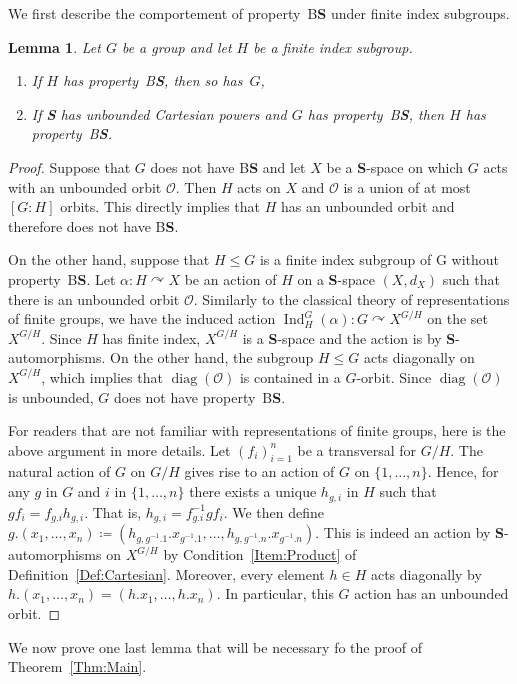 \documentclass[a4paper]{article}
\newtheorem{lem}{Lemma}[section]
\theoremstyle{definition}
\DeclareMathOperator\Ind{Ind}
\DeclareMathOperator\diag{diag}
\newcommand*{\orbite}{\mathcal O}
\newcommand*{\category}[1]{\textbf{#1}}
\newcommand*{\CatS}{\category{S}}
\newcommand*{\BS}{B\textbf{S}}
\begin{document}
We first describe the comportement of property~\BS{} under finite index subgroups.
%
%
\begin{lem}\label{Lemma:Subgroup}
Let $G$ be a group and let $H$ be a finite index subgroup.
\begin{enumerate}
\item
If $H$ has property~\BS, then so has~$G$,
\item
If \CatS{} has unbounded Cartesian powers and $G$ has property~\BS, then $H$ has property~\BS.
\end{enumerate}
\end{lem}
\begin{proof}
Suppose that $G$ does not have \BS{} and let $X$ be a \CatS-space on which $G$ acts with an unbounded orbit $\orbite$.
Then $H$ acts on $X$ and $\orbite$ is a union of at most $[G:H]$ orbits. This directly implies that $H$ has an unbounded orbit and therefore does not have \BS.

On the other hand, suppose that $H\leq G$ is a finite index subgroup of G without property~\BS.
Let $\alpha\colon H\curvearrowright X$ be an action of $H$ on a \CatS-space $(X,d_X)$ such that there is an unbounded orbit $\orbite$.
Similarly to the classical theory of representations of finite groups, we have the induced  action $\Ind_H^G(\alpha)\colon G \curvearrowright X^{G/H}$ on the set $X^{G/H}$. Since $H$ has finite index, $X^{G/H}$ is a \CatS-space and the action is by \CatS-automorphisms. On the other hand, the subgroup $H\leq G$ acts diagonally on $X^{G/H}$, which implies that $\diag(\orbite)$ is contained in a $G$-orbit.
Since $\diag(\orbite)$ is unbounded, $G$ does not have property~\BS.

For readers that are not familiar with representations of finite groups, here is the above argument in more details.
Let $(f_i)_{i=1}^n$ be a transversal for $G/H$.
The natural action of $G$ on $G/H$ gives rise to an action of $G$ on $\{1,\dots,n\}$.
Hence, for any $g$ in $G$ and $i$ in $\{1,\dots,n\}$ there exists a unique $h_{g,i}$ in $H$ such that $gf_i=f_{g.i}h_{g,i}$. That is, $h_{g,i}=f_{g.i}^{-1}gf_i$.
We then define $g.(x_1,\dots,x_n)\coloneqq(h_{g,g^{-1}.1}.x_{g^{-1}.1},\dots,h_{g,g^{-1}.n}.x_{g^{-1}.n})$. This is indeed an action by \CatS-auto\-mor\-phisms on $X^{G/H}$ by Condition~\ref{Item:Product} of Definition~\ref{Def:Cartesian}.
Moreover, every element $h\in H$ acts diagonally by $h.(x_1,\dots,x_n)=(h.x_1,\dots,h.x_n)$.
In particular, this $G$ action has an unbounded orbit.
\end{proof}
%
%
We now prove one last lemma that will be necessary fo the proof of Theorem~\ref{Thm:Main}.
\end{document}
